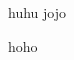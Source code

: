 \documentclass[a4,notes]{seminar}
\begin{document}
\begin{slide}
\center huhu
\pause
\center jojo
\end{slide}

\begin{slide}
\center hoho
\end{slide}
\end{document}
